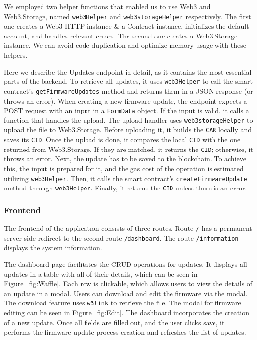 \documentclass[conference]{IEEEtran}
\begin{document}
We employed two helper functions that enabled us to use Web3 and Web3.Storage, named \texttt{web3Helper} and \texttt{web3storageHelper} respectively. The first one creates a Web3 HTTP instance \& a Contract instance, initializes the default account, and handles relevant errors. The second one creates a Web3.Storage instance. We can avoid code duplication and optimize memory usage with these helpers.

Here we describe the Updates endpoint in detail, as it contains the most essential parts of the backend. To retrieve all updates, it uses \texttt{web3Helper} to call the smart contract's \texttt{getFirmwareUpdates} method and returns them in a JSON response (or throws an error). When creating a new firmware update, the endpoint expects a POST request with an input in a \texttt{FormData} object. If the input is valid, it calls a function that handles the upload. The upload handler uses \texttt{web3storageHelper} to upload the file to Web3.Storage. Before uploading it, it builds the \texttt{CAR} locally and saves its \texttt{CID}. Once the upload is done, it compares the local \texttt{CID} with the one returned from Web3.Storage. If they are matched, it returns the \texttt{CID}; otherwise, it throws an error. Next, the update has to be saved to the blockchain. To achieve this, the input is prepared for it, and the gas cost of the operation is estimated utilizing \texttt{web3Helper}. Then, it calls the smart contract's \texttt{createFirmwareUpdate} method through \texttt{web3Helper}. Finally, it returns the \texttt{CID} unless there is an error. %


\subsubsection{Frontend}

The frontend of the application consists of three routes. Route \texttt{/} has a permanent server-side redirect to the second route \texttt{/dashboard}. The route \texttt{/information} displays the system information.

The dashboard page facilitates the CRUD operations for updates. It displays all updates in a table with all of their details, which can be seen in Figure~\ref{fig:Waffle}. Each row is clickable, which allows users to view the details of an update in a modal. Users can download and edit the firmware via the modal. The download feature uses \texttt{w3link} to retrieve the file. The modal for firmware editing can be seen in Figure~\ref{fig:Edit}. The dashboard incorporates the creation of a new update. Once all fields are filled out, and the user clicks save, it performs the firmware update process creation and refreshes the list of updates. %
\end{document}
